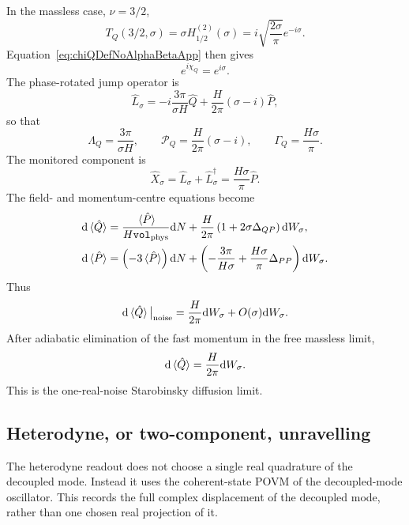 \documentclass{article}
\newcommand{\Vphys}{\mathtt{vol}_{\rm phys}}
\numberwithin{equation}{section}
\begin{document}
	In the massless case, \(\nu=3/2\),
	\begin{equation}
		T_Q(3/2,\sigma) = \sigma H_{1/2}^{(2)}(\sigma) = i\sqrt{\frac{2\sigma}{\pi}}e^{-i\sigma}.
	\end{equation}
	Equation~\eqref{eq:chiQDefNoAlphaBetaApp} then gives
	\begin{equation}
		e^{i\chi_Q}=e^{i\sigma}.
	\end{equation}
	The phase-rotated jump operator is
	\begin{equation}
		\hat L_\sigma = -i\frac{3\pi}{\sigma H}\hat Q + \frac{H}{2\pi}(\sigma-i)\hat P,
	\end{equation}
	so that
	\begin{equation}
		\Lambda_Q=\frac{3\pi}{\sigma H}, \qquad \mathcal P_Q=\frac{H}{2\pi}(\sigma-i), \qquad \Gamma_Q=\frac{H\sigma}{\pi}.
	\end{equation}
	The monitored component is
	\begin{equation}
		\hat X_\sigma = \hat L_\sigma+\hat L_\sigma^\dagger = \frac{H\sigma}{\pi}\hat P .
	\end{equation}
	The field- and momentum-centre equations become
	\begin{align}
		\dd\ev*{\hat Q} &= \frac{\ev*{\hat P}}{H\Vphys}\dd N + \frac{H}{2\pi} \left( 1+2\sigma\Delta_{QP} \right)\dd W_\sigma, \\ \dd\ev*{\hat P} &= \left( -3\ev*{\hat P} \right)\dd N + \left( -\frac{3\pi}{H\sigma} + \frac{H\sigma}{\pi}\Delta_{PP} \right)\dd W_\sigma .
	\end{align}
	Thus
	\begin{equation}
		\dd\ev*{\hat Q}\big|_{\rm noise} = \frac{H}{2\pi}\dd W_\sigma + O(\sigma)\dd W_\sigma .
	\end{equation}
	After adiabatic elimination of the fast momentum in the free massless limit,
	\begin{equation}
		\dd\ev*{\hat Q} = \frac{H}{2\pi}\dd W_\sigma .
	\end{equation}
	This is the one-real-noise Starobinsky diffusion limit.

	\subsection{Heterodyne, or two-component, unravelling}
	\label{app:two_comp}

	The heterodyne readout does not choose a single real quadrature of the decoupled mode. Instead it uses the coherent-state POVM of the decoupled-mode oscillator. This records the full complex displacement of the decoupled mode, rather than one chosen real projection of it.
\end{document}
